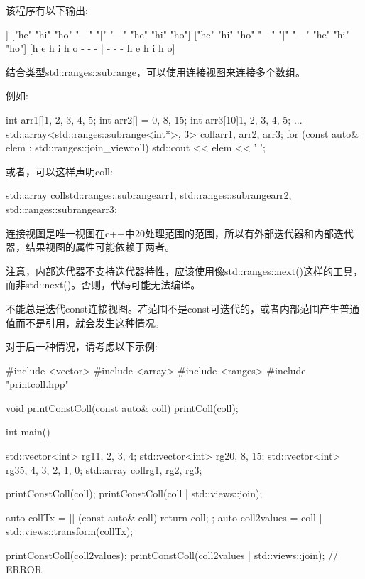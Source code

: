 该程序有以下输出:

\begin{shell}
[["he" "hi" "ho"] ["---" "|" "---"] ["he" "hi" "ho"]]
["he" "hi" "ho" "---" "|" "---" "he" "hi" "ho"]
["he" "hi" "ho" "---" "|" "---" "he" "hi" "ho"]
[h e h i h o - - - | - - - h e h i h o]
\end{shell}

结合类型std::ranges::subrange，可以使用连接视图来连接多个数组。

例如:

\begin{cpp}
int arr1[]{1, 2, 3, 4, 5};
int arr2[] = {0, 8, 15};
int arr3[10]{1, 2, 3, 4, 5};
...
std::array<std::ranges::subrange<int*>, 3> coll{arr1, arr2, arr3};
for (const auto& elem : std::ranges::join_view{coll}) {
	std::cout << elem << ' ';
}
\end{cpp}

或者，可以这样声明coll:

\begin{cpp}
std::array coll{std::ranges::subrange{arr1},
				std::ranges::subrange{arr2},
				std::ranges::subrange{arr3}};
\end{cpp}

连接视图是唯一视图在c++中20处理范围的范围，所以有外部迭代器和内部迭代器，结果视图的属性可能依赖于两者。

注意，内部迭代器不支持迭代器特性，应该使用像std::ranges::next()这样的工具，而非std::next()。否则，代码可能无法编译。


不能总是迭代const连接视图。若范围不是const可迭代的，或者内部范围产生普通值而不是引用，就会发生这种情况。

对于后一种情况，请考虑以下示例:


\begin{cpp}
#include <vector>
#include <array>
#include <ranges>
#include "printcoll.hpp"

void printConstColl(const auto& coll)
{
	printColl(coll);
}

int main()
{
	std::vector<int> rg1{1, 2, 3, 4};
	std::vector<int> rg2{0, 8, 15};
	std::vector<int> rg3{5, 4, 3, 2, 1, 0};
	std::array coll{rg1, rg2, rg3};
	
	printConstColl(coll);
	printConstColl(coll | std::views::join);
	
	auto collTx = [] (const auto& coll) { return coll; };
	auto coll2values = coll | std::views::transform(collTx);
	
	printConstColl(coll2values);
	printConstColl(coll2values | std::views::join); // ERROR
}
\end{cpp}

